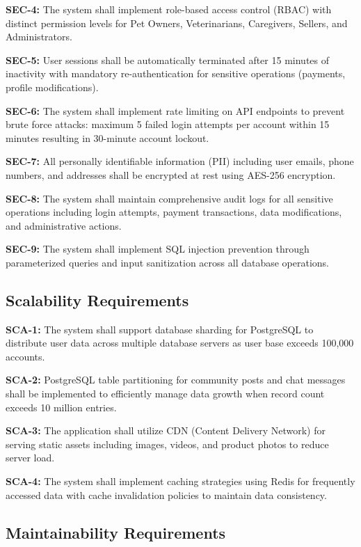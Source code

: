 \textbf{SEC-4:} The system shall implement role-based access control (RBAC) with distinct permission levels for Pet Owners, Veterinarians, Caregivers, Sellers, and Administrators.

\textbf{SEC-5:} User sessions shall be automatically terminated after 15 minutes of inactivity with mandatory re-authentication for sensitive operations (payments, profile modifications).

\textbf{SEC-6:} The system shall implement rate limiting on API endpoints to prevent brute force attacks: maximum 5 failed login attempts per account within 15 minutes resulting in 30-minute account lockout.

\textbf{SEC-7:} All personally identifiable information (PII) including user emails, phone numbers, and addresses shall be encrypted at rest using AES-256 encryption.

\textbf{SEC-8:} The system shall maintain comprehensive audit logs for all sensitive operations including login attempts, payment transactions, data modifications, and administrative actions.

\textbf{SEC-9:} The system shall implement SQL injection prevention through parameterized queries and input sanitization across all database operations.

\subsection{Scalability Requirements}



\textbf{SCA-1:} The system shall support database sharding for PostgreSQL to distribute user data across multiple database servers as user base exceeds 100,000 accounts.

\textbf{SCA-2:} PostgreSQL table partitioning for community posts and chat messages shall be implemented to efficiently manage data growth when record count exceeds 10 million entries.

\textbf{SCA-3:} The application shall utilize CDN (Content Delivery Network) for serving static assets including images, videos, and product photos to reduce server load.

\textbf{SCA-4:} The system shall implement caching strategies using Redis for frequently accessed data with cache invalidation policies to maintain data consistency.

\subsection{Maintainability Requirements}



